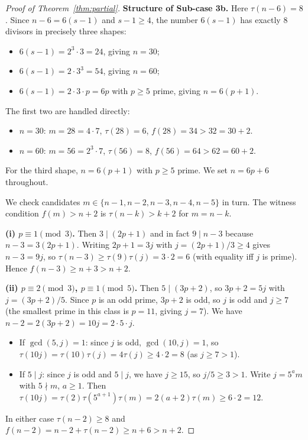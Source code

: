 \documentclass[11pt]{article}
\begin{document}
\begin{proof}[Proof of Theorem~\ref{thm:partial}]
\medskip
\noindent\textbf{Structure of Sub-case 3b.}
Here $\tau(n-6)=8$.  Since $n-6 = 6(s-1)$ and $s-1 \ge 4$, the number $6(s-1)$
has exactly $8$ divisors in precisely three shapes:
\begin{itemize}
  \item $6(s-1) = 2^3 \cdot 3 = 24$, giving $n = 30$;
  \item $6(s-1) = 2\cdot 3^3 = 54$, giving $n = 60$;
  \item $6(s-1) = 2 \cdot 3 \cdot p = 6p$ with $p \ge 5$ prime, giving $n = 6(p+1)$.
\end{itemize}
The first two are handled directly:
\begin{itemize}
  \item $n = 30$: $m = 28 = 4 \cdot 7$, $\tau(28) = 6$, $f(28) = 34 > 32 = 30+2$.
  \item $n = 60$: $m = 56 = 2^3 \cdot 7$, $\tau(56) = 8$, $f(56) = 64 > 62 = 60+2$.
\end{itemize}
For the third shape, $n = 6(p+1)$ with $p \ge 5$ prime.  We set $n = 6p+6$ throughout.

We check candidates $m \in \{n-1,n-2,n-3,n-4,n-5\}$ in turn.  The witness
condition $f(m)>n+2$ is $\tau(n-k)>k+2$ for $m=n-k$.

\textbf{(i) $p \equiv 1 \pmod{3}$.}
Then $3 \mid (2p+1)$ and in fact $9 \mid n-3$ because
$n-3 = 3(2p+1)$.  Writing $2p+1 = 3j$ with $j = (2p+1)/3 \ge 4$
gives $n-3 = 9j$, so $\tau(n-3) \ge \tau(9)\tau(j) = 3 \cdot 2 = 6$
(with equality iff $j$ is prime).  Hence $f(n-3) \ge n+3 > n+2$.

\textbf{(ii) $p \equiv 2 \pmod{3}$, $p \equiv 1 \pmod{5}$.}
Then $5 \mid (3p+2)$, so $3p+2 = 5j$ with $j = (3p+2)/5$.
Since $p$ is an odd prime, $3p+2$ is odd, so $j$ is odd and $j \ge 7$ (the
smallest prime in this class is $p=11$, giving $j=7$).
We have $n-2 = 2(3p+2) = 10j = 2 \cdot 5 \cdot j$.
\begin{itemize}
  \item If $\gcd(5,j)=1$: since $j$ is odd, $\gcd(10,j)=1$, so
        $\tau(10j) = \tau(10)\tau(j) = 4\tau(j) \ge 4 \cdot 2 = 8$
        (as $j \ge 7 > 1$).
  \item If $5 \mid j$: since $j$ is odd and $5 \mid j$, we have $j \ge 15$,
        so $j/5 \ge 3 > 1$.  Write $j = 5^a m$ with $5 \nmid m$, $a \ge 1$.
        Then $\tau(10j) = \tau(2)\tau(5^{a+1})\tau(m) = 2(a+2)\tau(m) \ge 6 \cdot 2 = 12$.
\end{itemize}
In either case $\tau(n-2) \ge 8$ and $f(n-2) = n - 2 + \tau(n-2) \ge n + 6 > n+2$.


\end{proof}
\end{document}
